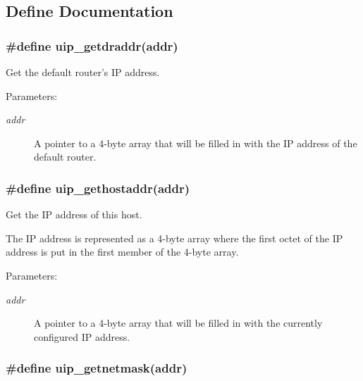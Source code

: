 \subsection{Define Documentation}
\hypertarget{a00061_gd8e8bc9bc0e2ea4a24a8a024fd3a7f7c}{
\subsubsection[uip\_\-getdraddr]{\setlength{\rightskip}{0pt plus 5cm}\#define uip\_\-getdraddr(addr)}}
\label{a00061_gd8e8bc9bc0e2ea4a24a8a024fd3a7f7c}


Get the default router's IP address. 

\begin{Desc}
\item[Parameters:]
\begin{description}
\item[{\em addr}]A pointer to a 4-byte array that will be filled in with the IP address of the default router. \end{description}
\end{Desc}
\hypertarget{a00061_g20bc87e5c063c3f4b01547be6e5a0148}{
\subsubsection[uip\_\-gethostaddr]{\setlength{\rightskip}{0pt plus 5cm}\#define uip\_\-gethostaddr(addr)}}
\label{a00061_g20bc87e5c063c3f4b01547be6e5a0148}


Get the IP address of this host. 

The IP address is represented as a 4-byte array where the first octet of the IP address is put in the first member of the 4-byte array.

\begin{Desc}
\item[Parameters:]
\begin{description}
\item[{\em addr}]A pointer to a 4-byte array that will be filled in with the currently configured IP address. \end{description}
\end{Desc}
\hypertarget{a00061_g5323320b7316647042016f17c4e881be}{
\subsubsection[uip\_\-getnetmask]{\setlength{\rightskip}{0pt plus 5cm}\#define uip\_\-getnetmask(addr)}}
\label{a00061_g5323320b7316647042016f17c4e881be}


